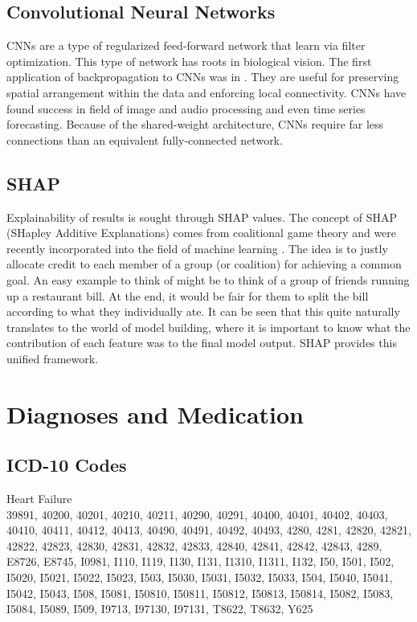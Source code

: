 \documentclass[%
 twocolumn,
 reprint,
 amsmath,amssymb,
 aps,nofootinbib
]{revtex4-2}
\begin{document}
\subsection{\label{app:conv}Convolutional Neural Networks}
CNNs are a type of regularized feed-forward network that learn via filter optimization. This type of network has roots in biological vision. The first application of backpropagation to CNNs was in \cite{cnn}. They are useful for preserving spatial arrangement within the data and enforcing local connectivity. CNNs have found success in field of image and audio processing and even time series forecasting. Because of the shared-weight architecture, CNNs require far less connections than an equivalent fully-connected network.

\subsection{\label{app:SHAP}SHAP}
Explainability of results is sought through SHAP values. The concept of SHAP (SHapley Additive Explanations) comes from coalitional game theory and were recently incorporated into the field of machine learning \cite{shap_force_plot} \cite{shap}. The idea is to justly allocate credit to each member of a group (or coalition) for achieving a common goal. An easy example to think of might be to think of a group of friends running up a restaurant bill. At the end, it would be fair for them to split the bill according to what they individually ate. It can be seen that this quite naturally translates to the world of model building, where it is important to know what the contribution of each feature was to the final model output. SHAP provides this unified framework.\\


\section{\label{appdx3}Diagnoses and Medication}

\subsection{\label{app:diag_codes}ICD-10 Codes}

Heart Failure \\

39891, 40200, 40201, 40210, 40211, 40290, 40291, 40400, 40401, 40402, 40403, 40410, 40411, 40412, 40413, 40490, 40491, 40492, 40493, 4280, 4281, 42820, 42821, 42822, 42823, 42830, 42831, 42832, 42833, 42840, 42841, 42842, 42843, 4289, E8726, E8745, I0981, I110, I119, I130, I131, I1310, I1311, I132, I50, I501, I502, I5020, I5021, I5022, I5023, I503, I5030, I5031, I5032, I5033, I504, I5040, I5041, I5042, I5043, I508, I5081, I50810, I50811, I50812, I50813, I50814, I5082, I5083, I5084, I5089, I509, I9713, I97130, I97131, T8622, T8632, Y625\\
\end{document}
